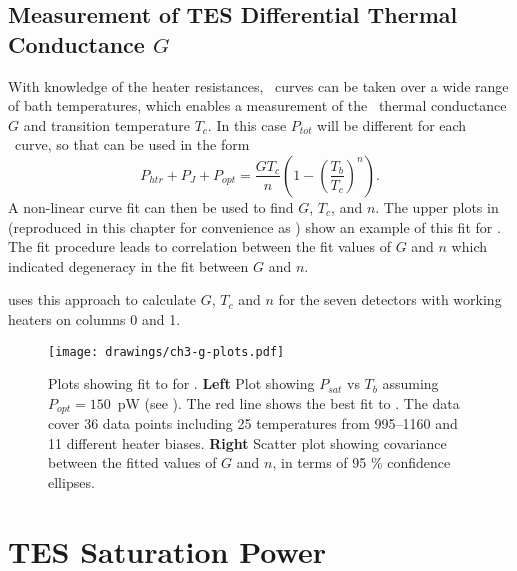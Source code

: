 \subsection{Measurement of \textsc{TES} Differential Thermal Conductance $G$}

With knowledge of the heater resistances, \IV\ curves can be taken over a wide range of bath temperatures, which enables a measurement of the \TES\ thermal conductance $G$ and transition temperature $T_c$.
In this case $P_{tot}$ will be different for each \IV\ curve, so that  can be used in the form
\begin{equation}\label{eqn:ch3-g-fit}
P_{htr} + P_J + P_{opt}= \frac{G T_c}{n}\left(1 - \left(\frac{T_b}{T_c}\right)^n\right).
\end{equation}
A non-linear curve fit can then be used to find $G$, $T_c$, and $n$.
The upper plots in  (reproduced in this chapter for convenience as ) show an example of this fit for .
The fit procedure leads to correlation between the fit values of $G$ and $n$ which indicated degeneracy in the fit between $G$ and $n$.

 uses this approach to calculate $G$, $T_c$ and $n$ for the seven detectors with working heaters on columns 0 and 1.

\begin{figure*}
\texttt{[image: drawings/ch3-g-plots.pdf]}
\caption[Plots showing fit to ]{
Plots showing fit to  for .
\textbf{Left} Plot showing $P_{sat}$ vs $T_b$ assuming $P_{opt} = 150$~pW (see ).
The red line shows the best fit to .
The data cover 36 data points including 25 temperatures from \SIrange{995}{1160}{\mK} and 11 different heater biases.
\textbf{Right} Scatter plot showing covariance between the fitted values of $G$ and $n$, in terms of 95 \% confidence ellipses.} 
\label{fig:ch3-g-plots}
\end{figure*}

\section{\textsc{TES} Saturation Power} \label{sec:ch3-psat}

